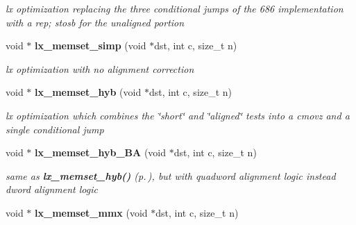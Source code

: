 \begin{CompactItemize}
\begin{CompactList}\small\item\em lx optimization replacing the three conditional jumps of the 686 implementation with a rep; stosb for the unaligned portion\item\end{CompactList}\item 
{}
void $\ast$ {\bf lx\_\-memset\_\-simp} (void $\ast$dst, int c, size\_\-t n)\label{memset_2def__test_8h_a6}

\begin{CompactList}\small\item\em lx optimization with no alignment correction\item\end{CompactList}\item 
{}
void $\ast$ {\bf lx\_\-memset\_\-hyb} (void $\ast$dst, int c, size\_\-t n)\label{memset_2def__test_8h_a7}

\begin{CompactList}\small\item\em lx optimization which combines the \char`\"{}short\char`\"{} and \char`\"{}aligned\char`\"{} tests into a cmovz and a single conditional jump\item\end{CompactList}\item 
{}
void $\ast$ {\bf lx\_\-memset\_\-hyb\_\-BA} (void $\ast$dst, int c, size\_\-t n)\label{memset_2def__test_8h_a8}

\begin{CompactList}\small\item\em same as {\bf lx\_\-memset\_\-hyb()} {\rm (p.\,\pageref{memset_2def__test_8h_a7})}, but with quadword alignment logic instead dword alignment logic\item\end{CompactList}\item 
{}
void $\ast$ {\bf lx\_\-memset\_\-mmx} (void $\ast$dst, int c, size\_\-t n)\label{memset_2def__test_8h_a9}


\end{CompactItemize}

